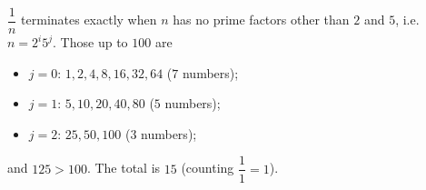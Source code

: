 $\dfrac1n$ terminates exactly when $n$ has no prime factors other than $2$ and $5$, i.e. $n=2^i5^j$. Those up to $100$ are
\begin{itemize}
\item $j=0$: $1,2,4,8,16,32,64$ ($7$ numbers);
\item $j=1$: $5,10,20,40,80$ ($5$ numbers);
\item $j=2$: $25,50,100$ ($3$ numbers);
\end{itemize}
and $125>100$. The total is $\boxed{15}$ (counting $\dfrac11=1$).
